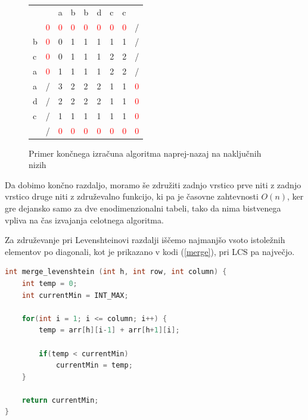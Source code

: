 \documentclass[a4paper,12pt,openright]{book}
\begin{document}
\begin{figure}[htb]
\begin{center}
\begin{tabular}{|l|l|l|l|l|l|l|l|l|}
\cline{3-8}
  \multicolumn{2}{c|}{}  & a & b & b & d & c & c & \multicolumn{1}{|c}{} \\ \cline{2-9}
 \multicolumn{1}{c|}{} & \textcolor{red}{0} & \textcolor{red}{0} & \textcolor{red}{0} & \textcolor{red}{0} & \textcolor{red}{0} & \textcolor{red}{0} & \textcolor{red}{0} & / \\ \hline
b  & \textcolor{red}{0}  & 0 & 1 & 1 & 1 & 1 & 1 & / \\ \hline
c  & \textcolor{red}{0} & 0 & 1 & 1 & 1 & 2 & 2 & / \\ \hline
a  & \textcolor{red}{0} & \cellcolor{blue!15}1 & \cellcolor{blue!15}1 & \cellcolor{blue!15}1 & \cellcolor{blue!15}1 & \cellcolor{blue!15}2 & \cellcolor{blue!15}2 & / \\ \hline
a  & / & \cellcolor{blue!15}3  & \cellcolor{blue!15}2 &  \cellcolor{blue!15}2 & \cellcolor{blue!15}2 & \cellcolor{blue!15}1 & \cellcolor{blue!15}1 & \textcolor{red}{0} \\ \hline
d  & / & 2 & 2 & 2 & 2 & 1 & 1 & \textcolor{red}{0} \\ \hline
c  & / & 1 & 1 & 1 & 1 & 1 & 1 & \textcolor{red}{0} \\ \hline
\multicolumn{1}{c|}{}  & / & \textcolor{red}{0} & \textcolor{red}{0} & \textcolor{red}{0} & \textcolor{red}{0} & \textcolor{red}{0} & \textcolor{red}{0} & \textcolor{red}{0} \\ \cline{2-9}
\end{tabular}

\end{center}
\caption{Primer končnega izračuna algoritma naprej-nazaj na naključnih nizih}
\label{fbLCSresult}
\end{figure}

Da dobimo končno razdaljo, moramo še združiti zadnjo vrstico prve niti z zadnjo vrstico druge niti z združevalno funkcijo, ki pa je časovne zahtevnosti \begin{math}O(n)\end{math}, ker gre dejansko samo za dve enodimenzionalni tabeli, tako da nima bistvenega vpliva na čas izvajanja celotnega algoritma. 

Za združevanje pri Levenshteinovi razdalji iščemo najmanjšo vsoto istoležnih elementov po diagonali, kot je prikazano v kodi (\ref{merge}), pri LCS pa največjo. 


\bigskip
\begin{lstlisting}[language=C++, caption={Združevalna funkcija za Levenshteinovo razdaljo}, captionpos=b, label=merge]
int merge_levenshtein (int h, int row, int column) {
    int temp = 0;
    int currentMin = INT_MAX;

    for(int i = 1; i <= column; i++) {
        temp = arr[h][i-1] + arr[h+1][i];

        if(temp < currentMin)
            currentMin = temp;
    }

    return currentMin;
}
\end{lstlisting}
\end{document}
